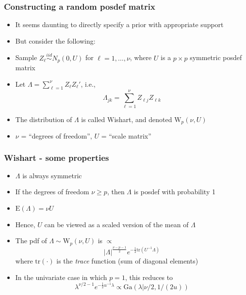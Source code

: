\documentclass[handout]{beamer}
\begin{document}
\begin{frame}
\frametitle{Constructing a random posdef matrix}
\begin{itemize}[<+-| alert@+>]
\item It seems daunting to directly specify a prior with appropriate support 

\item But consider the following:

\item Sample $Z_\ell \stackrel{iid}{\sim} N_p( 0, U )$ for $\ell=1,\ldots,\nu$, where $U$ is a $p\times p$ symmetric posdef matrix

\item Let $\Lambda = \sum_{\ell=1}^{\nu} Z_\ell Z_\ell'$, i.e., $$\Lambda_{jk} = \sum_{\ell=1}^{\nu} Z_{\ell j} Z_{\ell k}$$

\item The distribution of $\Lambda$ is called Wishart, and denoted $\mbox{W}_p(\nu,U)$

\item $\nu$ = ``degrees of freedom'', $U$ = ``scale matrix''
\end{itemize}
\end{frame}

\begin{frame}
\frametitle{Wishart - some properties}
\begin{itemize}[<+-| alert@+>]
\item $\Lambda$ is always symmetric

\item If the degrees of freedom $\nu \geq p$, then $\Lambda$ is posdef with probability 1

\item $\mbox{E}( \Lambda ) = \nu U$

\item Hence, $U$ can be viewed as a scaled version of the mean of $\Lambda$

\item The pdf of $\Lambda \sim \mbox{W}_p( \nu, U)$ is $\propto$
$$ | \Lambda |^{\frac{\nu-p-1}{2}} e^{ -\frac{1}{2} \mbox{tr}( U^{-1}\Lambda)}$$
where $\mbox{tr}(\cdot)$ is the {\em trace} function (sum of diagonal elements)

\item In the univariate case in which $p=1$, this reduces to 
    $$\lambda^{\nu/2 - 1} e^{-\frac{1}{2}u^{-1}\lambda } \propto \mbox{Ga}(\lambda|\nu/2, 1/(2 u))$$

\end{itemize}
\end{frame}
\end{document}
